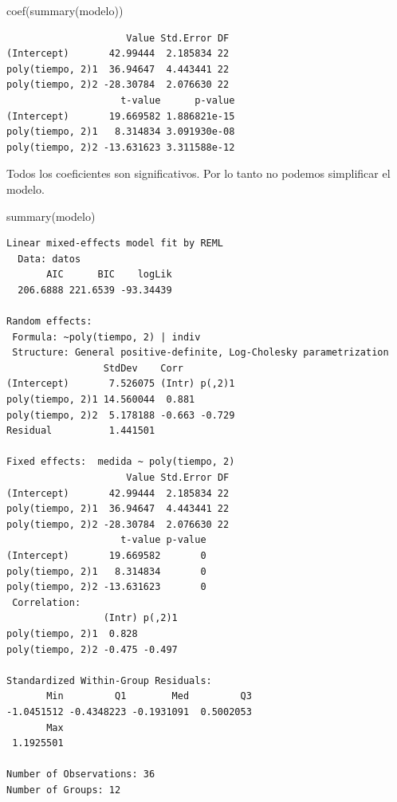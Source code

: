 \documentclass[
]{book}
\newenvironment{Shaded}{\begin{snugshade}}{\end{snugshade}}
\newcommand{\FunctionTok}[1]{\textcolor[rgb]{0.00,0.00,0.00}{#1}}
\newcommand{\NormalTok}[1]{#1}
\begin{document}
\begin{Shaded}
\begin{Highlighting}[]
\FunctionTok{coef}\NormalTok{(}\FunctionTok{summary}\NormalTok{(modelo))}
\end{Highlighting}
\end{Shaded}

\begin{verbatim}
                     Value Std.Error DF
(Intercept)       42.99444  2.185834 22
poly(tiempo, 2)1  36.94647  4.443441 22
poly(tiempo, 2)2 -28.30784  2.076630 22
                    t-value      p-value
(Intercept)       19.669582 1.886821e-15
poly(tiempo, 2)1   8.314834 3.091930e-08
poly(tiempo, 2)2 -13.631623 3.311588e-12
\end{verbatim}

Todos los coeficientes son significativos. Por lo tanto no podemos simplificar el modelo.

\begin{Shaded}
\begin{Highlighting}[]
\FunctionTok{summary}\NormalTok{(modelo)}
\end{Highlighting}
\end{Shaded}

\begin{verbatim}
Linear mixed-effects model fit by REML
  Data: datos 
       AIC      BIC    logLik
  206.6888 221.6539 -93.34439

Random effects:
 Formula: ~poly(tiempo, 2) | indiv
 Structure: General positive-definite, Log-Cholesky parametrization
                 StdDev    Corr         
(Intercept)       7.526075 (Intr) p(,2)1
poly(tiempo, 2)1 14.560044  0.881       
poly(tiempo, 2)2  5.178188 -0.663 -0.729
Residual          1.441501              

Fixed effects:  medida ~ poly(tiempo, 2) 
                     Value Std.Error DF
(Intercept)       42.99444  2.185834 22
poly(tiempo, 2)1  36.94647  4.443441 22
poly(tiempo, 2)2 -28.30784  2.076630 22
                    t-value p-value
(Intercept)       19.669582       0
poly(tiempo, 2)1   8.314834       0
poly(tiempo, 2)2 -13.631623       0
 Correlation: 
                 (Intr) p(,2)1
poly(tiempo, 2)1  0.828       
poly(tiempo, 2)2 -0.475 -0.497

Standardized Within-Group Residuals:
       Min         Q1        Med         Q3 
-1.0451512 -0.4348223 -0.1931091  0.5002053 
       Max 
 1.1925501 

Number of Observations: 36
Number of Groups: 12 
\end{verbatim}
\end{document}

